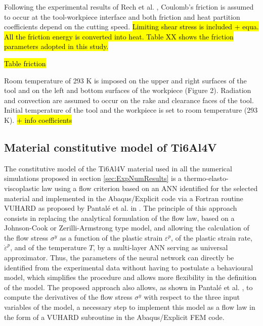 \documentclass[final,5p,times,twocolumn]{elsarticle}
\begin{document}
Following the experimental results of Rech et al. \cite{rech_characterisation_2013}, Coulomb's friction is assumed to occur at the tool-workpiece interface and both friction and heat partition coefficients depend on the cutting speed. \hl{Limiting shear stress is included + equa. All the friction energy is converted into heat. Table XX shows the friction parameters adopted in this study.}

%
\hl{Table friction}
%

Room temperature of 293 K is imposed on the upper and right surfaces of the tool and on the left and bottom surfaces of the workpiece (Figure 2). Radiation and convection are assumed to occur on the rake and clearance faces of the tool. Initial temperature of the tool and the workpiece is set to room temperature (293 K). \hl{+ info coefficients}

\subsection{Material constitutive model of Ti6Al4V}

The constitutive model of the Ti6Al4V material used in all the numerical simulations proposed in section \ref{sec:ExpNumResults} is a thermo-elasto-viscoplastic law using a flow criterion based on an ANN identified for the selected material and implemented in the Abaqus/Explicit code via a Fortran routine VUHARD as proposed by Pantalé et al. in \cite{pantale_efficient_2022}.
The principle of this approach consists in replacing the analytical formulation of the flow law, based on a Johnson-Cook or Zerilli-Armstrong type model, and allowing the calculation of the flow stress $\sigma^y$ as a function of the plastic strain $\varepsilon^p$, of the plastic strain rate, ${\dot{\varepsilon}}^p$, and of the temperature $T$, by a multi-layer ANN serving as universal approximator. Thus, the parameters of the neural network can directly be identified from the experimental data without having to postulate a behavioural model, which simplifies the procedure and allows more flexibility in the definition of the model.
The proposed approach also allows, as shown in Pantalé et al. \cite{pantale_efficient_2022}, to compute the derivatives of the flow stress $\sigma^y$ with respect to the three input variables of the model, a necessary step to implement this model as a flow law in the form of a VUHARD subroutine in the Abaqus/Explicit FEM code.
\end{document}
